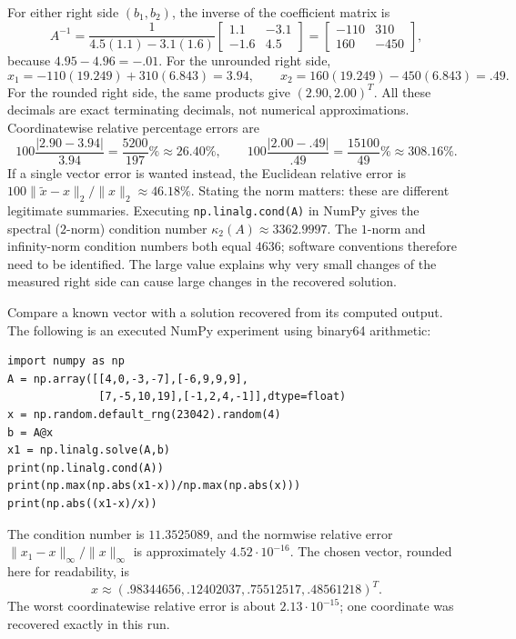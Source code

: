 For either right side $(b_1,b_2)$, the inverse of the coefficient matrix is
\[
 A^{-1}=\frac1{4.5(1.1)-3.1(1.6)}
 \begin{bmatrix}1.1&-3.1\\-1.6&4.5\end{bmatrix}
 =\begin{bmatrix}-110&310\\160&-450\end{bmatrix},
\]
because $4.95-4.96=-.01$. For the unrounded right side,
\[
 x_1=-110(19.249)+310(6.843)=3.94,\qquad
 x_2=160(19.249)-450(6.843)=.49.
\]
For the rounded right side, the same products give $(2.90,2.00)^T$.
All these decimals are exact terminating decimals, not numerical approximations.
Coordinatewise relative percentage errors are
\[
 100\frac{|2.90-3.94|}{3.94}=\frac{5200}{197}\%\approx26.40\%,
 \qquad
 100\frac{|2.00-.49|}{.49}=\frac{15100}{49}\%\approx308.16\%.
\]
If a single vector error is wanted instead, the Euclidean relative error is
$100\|\widetilde x-x\|_2/\|x\|_2\approx46.18\%$.
Stating the norm matters: these are different legitimate summaries.
Executing \texttt{np.linalg.cond(A)} in NumPy gives the spectral
($2$-norm) condition number $\kappa_2(A)\approx3362.9997$.
The $1$-norm and infinity-norm condition numbers both equal $4636$;
software conventions therefore need to be identified.
The large value explains why very small changes of the measured right
side can cause large changes in the recovered solution.

\goal Compare a known vector with a solution recovered from its computed output.
The following is an executed NumPy experiment using binary64 arithmetic:
\begin{verbatim}
import numpy as np
A = np.array([[4,0,-3,-7],[-6,9,9,9],
              [7,-5,10,19],[-1,2,4,-1]],dtype=float)
x = np.random.default_rng(23042).random(4)
b = A@x
x1 = np.linalg.solve(A,b)
print(np.linalg.cond(A))
print(np.max(np.abs(x1-x))/np.max(np.abs(x)))
print(np.abs((x1-x)/x))
\end{verbatim}
The condition number is $11.3525089$, and the normwise relative error
$\|x_1-x\|_\infty/\|x\|_\infty$ is approximately $4.52\cdot10^{-16}$.
The chosen vector, rounded here for readability, is
\[
 x\approx(.98344656,.12402037,.75512517,.48561218)^T.
\]
The worst coordinatewise relative error is about $2.13\cdot10^{-15}$;
one coordinate was recovered exactly in this run.

